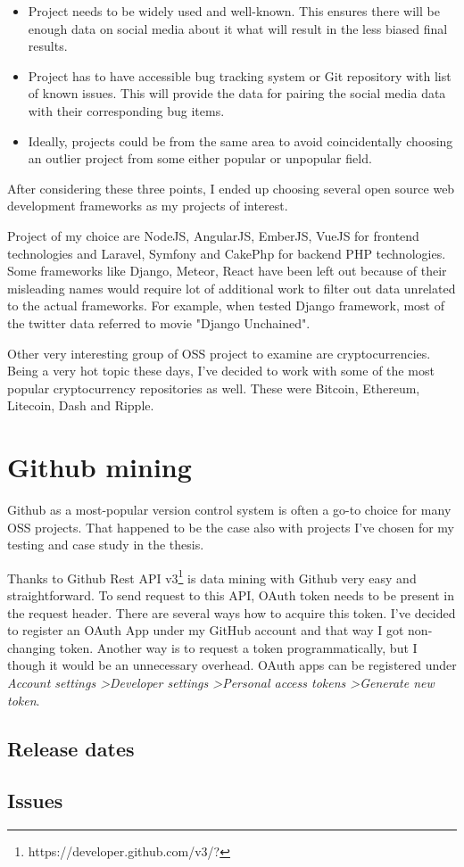 \begin{itemize}
  \item Project needs to be widely used and well-known. This ensures there will be enough data on social media about it what will result in the less biased final results.
  \item Project has to have accessible bug tracking system or Git repository with list of known issues. This will provide the data for pairing the social media data with their corresponding bug items.
  \item Ideally, projects could be from the same area to avoid coincidentally choosing an outlier project from some either popular or unpopular field.
\end{itemize}

After considering these three points, I ended up choosing several open source web development frameworks as my projects of interest. 

Project of my choice are NodeJS, AngularJS, EmberJS, VueJS for frontend technologies and Laravel, Symfony and CakePhp for backend PHP technologies. Some frameworks like Django, Meteor, React have been left out because of their misleading names  would require lot of additional work to filter out data unrelated to the actual frameworks. For example, when tested Django framework, most of the twitter data referred to movie "Django Unchained".

Other very interesting group of OSS project to examine are cryptocurrencies. Being a very hot topic these days, I've decided to work with some of the most popular cryptocurrency repositories as well. These were Bitcoin, Ethereum, Litecoin, Dash and Ripple.

\section{Github mining}
Github as a most-popular version control system is often a go-to choice for many OSS projects. That happened to be the case also with projects I've chosen for my testing and case study in the thesis.

Thanks to Github Rest API v3\footnote{https://developer.github.com/v3/?} is data mining with Github very easy and straightforward. To send request to this API, OAuth token needs to be present in the request header. There are several ways how to acquire this token. I've decided to register an OAuth App under my GitHub account and that way I got non-changing token. Another way is to request a token programmatically, but I though it would be an unnecessary overhead. OAuth apps can be registered under \textit{Account settings \textgreater Developer settings \textgreater Personal access tokens \textgreater Generate new token}.
\subsection{Release dates} \label{ssec:gitReleaseDatesMining}


\subsection{Issues} \label{ssec:issuesMining}